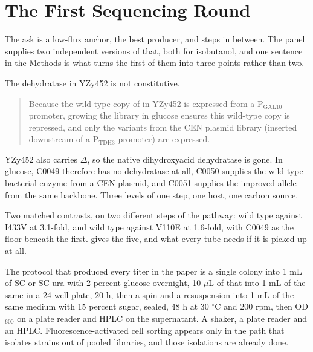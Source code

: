 
\section{The First Sequencing Round}
\label{sec:rnaseq}

The ask is a low-flux anchor, the best producer, and steps in between. The panel
supplies two independent versions of that, both for isobutanol, and one sentence
in the Methods is what turns the first of them into three points rather than
two.

 The dehydratase in YZy452 is not
constitutive.

\begin{quote}\small
Because the wild-type copy of  in YZy452 is expressed from a
P$_{\text{GAL10}}$ promoter, growing the library in glucose ensures this
wild-type copy is repressed, and only the  variants from the CEN
plasmid library (inserted downstream of a P$_{\text{TDH3}}$ promoter) are
expressed.
\end{quote}

\noindent
YZy452 also carries $\Delta$, so the native dihydroxyacid dehydratase
is gone. In glucose, C0049 therefore has no dehydratase at all, C0050 supplies
the wild-type bacterial enzyme from a CEN plasmid, and C0051 supplies the
improved allele from the same backbone. Three levels of one step, one host, one
carbon source.

 Two matched contrasts, on two different steps
of the pathway:  wild type against I433V at 3.1-fold, and
 wild type against V110E at 1.6-fold, with C0049 as the floor beneath
the first.  gives the five, and what every tube needs if it is
picked up at all.



 The protocol that produced every titer in
the paper is a single colony into 1 mL of SC or SC-ura with 2 percent glucose
overnight, 10 $\mu$L of that into 1 mL of the same in a 24-well plate, 20 h, then
a spin and a resuspension into 1 mL of the same medium with 15 percent sugar,
sealed, 48 h at 30 $^{\circ}$C and 200 rpm, then OD$_{600}$ on a plate reader and
HPLC on the supernatant. A shaker, a plate reader and an HPLC. Fluorescence-activated
cell sorting appears only in the path that isolates strains out of pooled
libraries, and those isolations are already done.

